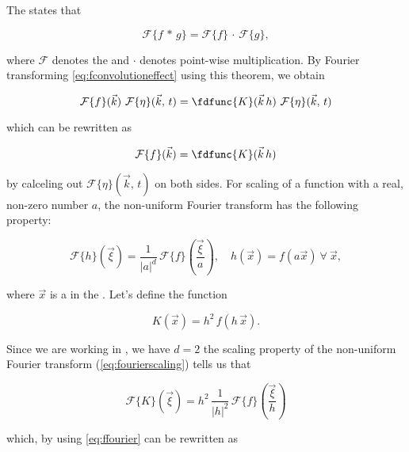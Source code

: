 The  states that

\begin{equation} \label{eq:convolutiontheorem}
\mathcal{F}\{f\,*\,g\} = \mathcal{F}\{f\}\,\cdot\,\mathcal{F}\{g\},
\end{equation}

where $\mathcal{F}$ denotes the  and $\cdot$ denotes point-wise multiplication. By Fourier transforming \eqref{eq:fconvolutioneffect} using this theorem, we obtain

\begin{equation}
\mathcal{F}\{f\}(\vec{k})\ \mathcal{F}\{\eta\}(\vec{k},\,t) = \fdfunc{K}(\vec{k}\,h)\ \mathcal{F}\{\eta\}(\vec{k},\,t)
\end{equation}

which can be rewritten as

\begin{equation} \label{eq:ffourier}
\mathcal{F}\{f\}(\vec{k}) = \fdfunc{K}(\vec{k}\,h)
\end{equation}

by calceling out $\mathcal{F}\{\eta\}(\vec{k},\,t)$ on both sides. For scaling of a function with a real, non-zero number $a$, the non-uniform Fourier transform has the following property:

\begin{equation} \label{eq:fourierscaling}
\mathcal{F}\{h\}(\vec{\xi}) = \frac{1}{|a|^d}\,\mathcal{F}\{f\}\left(\frac{\vec{\xi}}{a}\right)
,\quad
h(\vec{x}) = f(a\vec{x})\ \forall\ \vec{x},
\end{equation}

where $\vec{x}$ is a  in the . Let's define the function

\begin{equation} \label{eq:ftokernel}
K(\vec{x}) = h^2\,f(h\,\vec{x}).
\end{equation}

Since we are working in , we have $d = 2$ the scaling property of the non-uniform Fourier transform (\eqref{eq:fourierscaling}) tells us that

\begin{equation}
\mathcal{F}\{K\}(\vec{\xi}) = h^2\,\frac{1}{|h|^2}\,\mathcal{F}\{f\}\left(\frac{\vec{\xi}}{h}\right)
\end{equation}

which, by using \eqref{eq:ffourier} can be rewritten as

